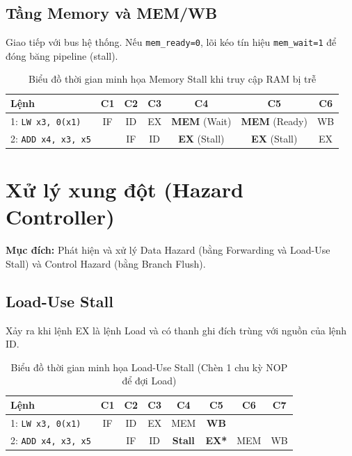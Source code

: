 \subsection{Tầng Memory và MEM/WB}
Giao tiếp với bus hệ thống. Nếu \texttt{mem\_ready=0}, lõi kéo tín hiệu \texttt{mem\_wait=1} để đóng băng pipeline (stall).

\begin{table}[H]
\centering
\begin{tabular}{|l|c|c|c|c|c|c|}
\hline
\textbf{Lệnh} & \textbf{C1} & \textbf{C2} & \textbf{C3} & \textbf{C4} & \textbf{C5} & \textbf{C6} \\
\hline
1: \texttt{LW x3, 0(x1)} & IF & ID & EX & \textbf{MEM} (Wait) & \textbf{MEM} (Ready) & WB \\
\hline
2: \texttt{ADD x4, x3, x5} & & IF & ID & \textbf{EX} (Stall) & \textbf{EX} (Stall) & EX \\
\hline
\end{tabular}
\caption{Biểu đồ thời gian minh họa Memory Stall khi truy cập RAM bị trễ}
\label{fig:mem_stall_wave}
\end{table}

\section{Xử lý xung đột (Hazard Controller)}
\textbf{Mục đích:} Phát hiện và xử lý Data Hazard (bằng Forwarding và Load-Use Stall) và Control Hazard (bằng Branch Flush).

\subsection{Load-Use Stall}
Xảy ra khi lệnh EX là lệnh Load và có thanh ghi đích trùng với nguồn của lệnh ID.
\begin{table}[H]
\centering
\begin{tabular}{|l|c|c|c|c|c|c|c|}
\hline
\textbf{Lệnh} & \textbf{C1} & \textbf{C2} & \textbf{C3} & \textbf{C4} & \textbf{C5} & \textbf{C6} & \textbf{C7} \\
\hline
1: \texttt{LW x3, 0(x1)} & IF & ID & EX & MEM & \textbf{WB} & & \\
\hline
2: \texttt{ADD x4, x3, x5} & & IF & ID & \textbf{Stall} & \textbf{EX*} & MEM & WB \\
\hline
\end{tabular}
\caption{Biểu đồ thời gian minh họa Load-Use Stall (Chèn 1 chu kỳ NOP để đợi Load)}
\label{fig:load_use_wave}
\end{table}


